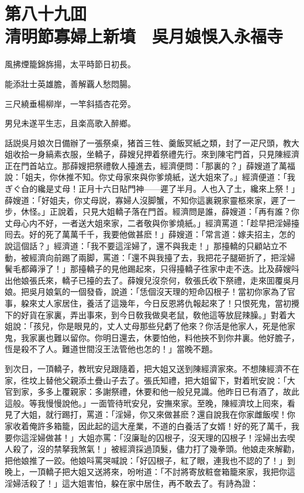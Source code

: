 
\chapter*{第八十九囬　\\清明節寡婦上新墳　吳月娘悞入永福寺}


\begin{myquote}
風拂煙籠錦旆揚，太平時節日初長。

能添壯士英雄膽，善解覊人愁悶腸。

三尺繞垂楊柳岸，一竿斜插杏花旁。

男兒未遂平生志，且楽高歌入醉鄉。
\end{myquote}

話説吳月娘次日備辦了一張祭桌，猪首三牲、羹飯冥紙之類，封了一疋尺頭，教大姐收拾一身縞素衣服，坐轎子，薛嫂兒押着祭禮先行。來到陳宅門首，只見陳經濟正在門首站立。那薛嫂把祭禮敎人擡進去，經濟便問：「那裏的？」薛嫂道了萬福說：「姐夫，你休推不知。你丈母家來與你爹燒紙，送大姐來了。」經濟便道：「我ぎぐ㒲的纔是丈母！正月十六日貼門神——遲了半月。人也入了土，纔來上祭！」薛嫂道：「好姐夫，你丈母説，寡婦人沒脚蟹，不知你這裏親家靈柩來家，遲了一步，休怪。」正說着，只見大姐轎子落在門首。經濟問是誰，薛嫂道：「再有誰？你丈母心内不好，一者送大姐來家，二者敬與你爹燒紙。」經濟罵道：「趁早把淫婦擡囘去。好的死了萬萬千千，我要他做甚麽！」薛嫂道：「常言道：嫁夫招主，怎的說這個話？」經濟道：「我不要這淫婦了，還不與我走！」那擡轎的只顧站立不動，被經濟向前踢了兩脚，罵道：「還不與我擡了去，我把花子腿砸折了，把淫婦鬢毛都薅淨了！」那擡轎子的見他踢起來，只得擡轎子徃家中走不迭。比及薛嫂呌出他娘張氏來，轎子已擡的去了。薛嫂兒沒奈何，敎張氏收下祭禮，走來囬覆吳月娘。把吳月娘氣的一個發昏，說道：「恁個沒天理的短命囚根子！當初你家為了官事，躱來丈人家居住，養活了這幾年，今日反恩將仇報起來了！只恨死鬼，當初攪下的好貨在家裏，弄出事來，到今日敎我做臭老鼠，敎他這等放屁辣臊。」對着大姐說：「孩兒，你是眼見的，丈人丈母那些兒虧了他來？你活是他家人，死是他家鬼，我家裏也難以留你。你明日還去，休要怕他，料他挾不到你井裏。他好膽子，恆是殺不了人。難道世間沒王法管他也怎的！」當晚不題。

到次日，一頂轎子，教玳安兒跟隨着，把大姐又送到陳經濟家來。不想陳經濟不在家，徃坟上替他父親添土疊山子去了。張氏知禮，把大姐留下，對着玳安說：「大官到家，多多上覆親家：多謝祭禮，休要和他一般兒見識。他昨日已有酒了，故此這般。等我慢慢說他。」一面管待玳安兒，安撫來家。至晚，陳經濟坟上囘來，看見了大姐，就行踢打，罵道：「淫婦，你又來做甚麽？還自說我在你家雌飯喫！你家收着俺許多箱籠，因此起的這大産業，不道的白養活了女婿！好的死了萬千，我要你這淫婦做甚！」大姐亦罵：「沒廉耻的囚根子，沒天理的囚根子！淫婦出去喫人殺了，沒的禁拏我煞氣！」被經濟採過頂髮，儘力打了幾拳頭。他娘走來解勸，把他娘推了一跤。他娘呌罵哭喊說：「好囚根子，紅了眼，連我也不認的了！」到晚上，一頂轎子把大姐又送將來，吩咐道：「不討將寄放粧奩箱籠來家，我把你這淫婦活殺了！」這大姐害怕，躱在家中居住，再不敢去了。有詩為證：

